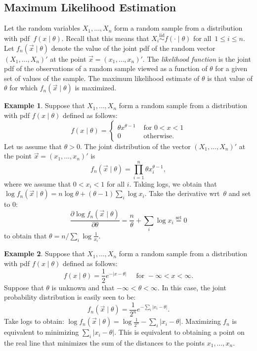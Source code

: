 \documentclass[11pt,a4]{article}
\newcommand{\set}{\ensuremath{\stackrel{\text{set}}{=}}}
\newcommand{\iid}{\ensuremath{\stackrel{\text{iid}}{\sim}}}
\theoremstyle{definition}
\newtheorem{example}{Example}
\begin{document}
\subsection{Maximum Likelihood Estimation}
Let the random variables $X_1, \ldots, X_n$ form a random sample from a 
distribution with pdf~$f(x \mid \theta)$. Recall that this means that 
$X_i \iid f( \cdot \mid \theta)$ for all~$1 \leq i \leq n$. 
Let $f_n(\vec{x} \mid \theta)$ denote the value of the joint pdf of 
the random vector $(X_1, \ldots, X_n)'$ at the point 
$\vec{x} = (x_1, \ldots, x_n)'$. The \emph{likelihood function} is the joint pdf 
of the observations of a random sample viewed as a function of $\theta$ for 
a given set of values of the sample. The maximum likelihood estimate of 
$\theta$ is that value of $\theta$ for which $f_n (\vec{x} \mid \theta)$ is 
maximized. 
\begin{example}
Suppose that $X_1, \ldots, X_n$ form a random sample from a distribution with 
pdf $f(x \mid \theta)$ defined as follows:
\[
    f(x \mid \theta) = 
        \left \{
            \begin{array}{ll}
                \theta x^{\theta - 1} & \text{ for } 0 < x < 1 \\
                0                     & \text{ otherwise}.
            \end{array} 
        \right .
\]
Let us assume that $\theta > 0$. The joint distribution of the vector 
$(X_1, \ldots, X_n)'$ at the point $\vec{x} = (x_1, \ldots, x_n)'$ is 
\[
    f_n (\vec{x} \mid \theta ) = \prod_{i = 1}^n \theta x_i^{\theta - 1},
\]
where we assume that $0 < x_i < 1$ for all $i$. Taking logs, we obtain that
$\log f_n (\vec{x} \mid \theta) = n \log \theta + (\theta - 1) \sum_i \log x_i$. 
Take the derivative wrt~$\theta$ and set to $0$:
\[
    \frac{\partial \log f_n (\vec{x} \mid \theta)}{\partial \theta} = 
        \frac{n}{\theta} + \sum_i \log x_i \set 0
\]
to obtain that $\theta = n / \sum_i \log \frac{1}{x_i}$.
\end{example}   

\begin{example}
Suppose that $X_1, \ldots, X_n$ form a random sample from a distribution with 
pdf $f(x \mid \theta)$ defined as follows:
\[
    f(x \mid \theta) = \frac{1}{2} e^{- |x - \theta|} 
        \quad \text{ for } -\infty < x < \infty.
\]
Suppose that $\theta$ is unknown and that $-\infty < \theta < \infty$. 
In this case, the joint probability distribution is easily seen to be:
\[
    f_n(\vec{x} \mid \theta) = \frac{1}{2^n} e^{- \sum_i |x_i - \theta|}.
\]
Take logs to obtain: 
$\log f_n (\vec{x} \mid \theta) = \log \frac{1}{2^n} - \sum_i |x_i - \theta|$. 
Maximizing $f_n$ is equivalent to minimizing $\sum_i |x_i - \theta|$. This 
is equivalent to obtaining a point on the real line that minimizes the sum 
of the distances to the points $x_1, \ldots, x_n$.
\end{example}
\end{document}
